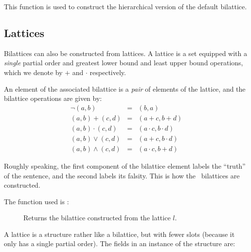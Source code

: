 This function is used to construct the hierarchical version of the
default bilattice.

\subsection{Lattices}

Bilattices can also be constructed from lattices.  A lattice is a set
equipped with a {\em single\/} partial order and greatest lower bound
and least upper bound operations, which we denote by $+$ and $\cdot$
respectively.

An element of the associated bilattice is a {\em pair\/} of elements
of the lattice, and the bilattice operations are given by:
 \begin{eqnarray*}
\neg(a,b) & = & (b,a) \\
(a,b) + (c,d) & = & (a+c,b+d) \\
(a,b) \cdot (c,d) & = & (a\cdot c,b\cdot d) \\
(a,b) \vee (c,d) & = & (a+c, b\cdot d) \\
(a,b) \wedge (c,d) & = & (a\cdot c,b+d)
 \end{eqnarray*}

Roughly speaking, the first component of the bilattice element labels
the ``truth'' of the sentence, and the second labels its falsity.  This
is how the \atms\ bilattices are constructed.

The function used is :

 \begin{description}
 \item [] Returns the bilattice constructed
from the lattice $l$.
 \end{description}

A lattice is a structure rather like a bilattice, but with fewer slots
(because it only has a single partial order).  The fields in an instance
of the  structure are:

